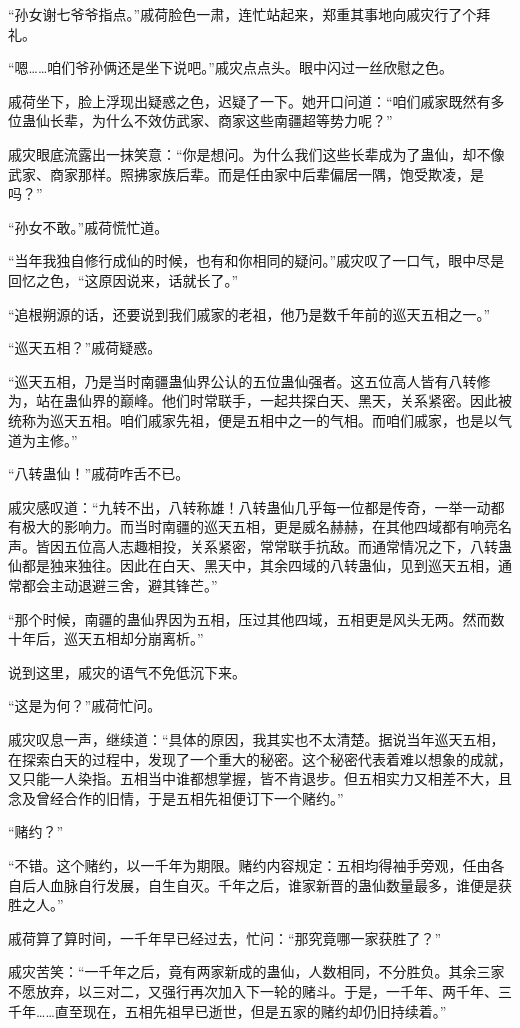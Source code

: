 \begin{this_body}
“孙女谢七爷爷指点。”戚荷脸色一肃，连忙站起来，郑重其事地向戚灾行了个拜礼。

“嗯……咱们爷孙俩还是坐下说吧。”戚灾点点头。眼中闪过一丝欣慰之色。

戚荷坐下，脸上浮现出疑惑之色，迟疑了一下。她开口问道：“咱们戚家既然有多位蛊仙长辈，为什么不效仿武家、商家这些南疆超等势力呢？”

戚灾眼底流露出一抹笑意：“你是想问。为什么我们这些长辈成为了蛊仙，却不像武家、商家那样。照拂家族后辈。而是任由家中后辈偏居一隅，饱受欺凌，是吗？”

“孙女不敢。”戚荷慌忙道。

“当年我独自修行成仙的时候，也有和你相同的疑问。”戚灾叹了一口气，眼中尽是回忆之色，“这原因说来，话就长了。”

“追根朔源的话，还要说到我们戚家的老祖，他乃是数千年前的巡天五相之一。”

“巡天五相？”戚荷疑惑。

“巡天五相，乃是当时南疆蛊仙界公认的五位蛊仙强者。这五位高人皆有八转修为，站在蛊仙界的巅峰。他们时常联手，一起共探白天、黑天，关系紧密。因此被统称为巡天五相。咱们戚家先祖，便是五相中之一的气相。而咱们戚家，也是以气道为主修。”

“八转蛊仙！”戚荷咋舌不已。

戚灾感叹道：“九转不出，八转称雄！八转蛊仙几乎每一位都是传奇，一举一动都有极大的影响力。而当时南疆的巡天五相，更是威名赫赫，在其他四域都有响亮名声。皆因五位高人志趣相投，关系紧密，常常联手抗敌。而通常情况之下，八转蛊仙都是独来独往。因此在白天、黑天中，其余四域的八转蛊仙，见到巡天五相，通常都会主动退避三舍，避其锋芒。”

“那个时候，南疆的蛊仙界因为五相，压过其他四域，五相更是风头无两。然而数十年后，巡天五相却分崩离析。”

说到这里，戚灾的语气不免低沉下来。

“这是为何？”戚荷忙问。

戚灾叹息一声，继续道：“具体的原因，我其实也不太清楚。据说当年巡天五相，在探索白天的过程中，发现了一个重大的秘密。这个秘密代表着难以想象的成就，又只能一人染指。五相当中谁都想掌握，皆不肯退步。但五相实力又相差不大，且念及曾经合作的旧情，于是五相先祖便订下一个赌约。”

“赌约？”

“不错。这个赌约，以一千年为期限。赌约内容规定：五相均得袖手旁观，任由各自后人血脉自行发展，自生自灭。千年之后，谁家新晋的蛊仙数量最多，谁便是获胜之人。”

戚荷算了算时间，一千年早已经过去，忙问：“那究竟哪一家获胜了？”

戚灾苦笑：“一千年之后，竟有两家新成的蛊仙，人数相同，不分胜负。其余三家不愿放弃，以三对二，又强行再次加入下一轮的赌斗。于是，一千年、两千年、三千年……直至现在，五相先祖早已逝世，但是五家的赌约却仍旧持续着。”


\end{this_body}
